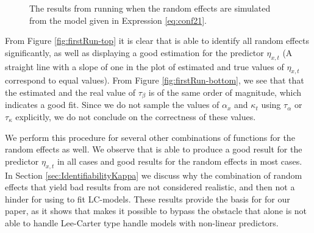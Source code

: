 \begin{figure}[h!]
    \caption{The results from running \inlabru when the random effects are simulated from the model given in Expression \ref{eq:conf21}. }
    \label{fig:firstRun}
\end{figure}
\newpar From Figure \ref{fig:firstRun-top} it is clear that \inlabru is able to identify all random effects significantly, as well as displaying a good estimation for the predictor $\eta_{x,t}$ (A straight line with a slope of one in the plot of estimated and true values of $\eta_{x,t}$ correspond to equal values). From Figure \ref{fig:firstRun-bottom}, we see that that the estimated and the real value of $\tau_\beta$ is of the same order of magnitude, which indicates a good fit. Since we do not sample the values of $\alpha_x$ and $\kappa_t$ using $\tau_\alpha$ or $\tau_\kappa$ explicitly, we do not conclude on the correctness of these values. 

\newpar We perform this procedure for several other combinations of functions for the random effects as well. We observe that \inlabru is able to produce a good result for the predictor $\eta_{x,t}$ in all cases and good results for the random effects in most cases. In Section \ref{sec:IdentifiabilityKappa} we discuss why the combination of random effects that yield bad results from \inlabru are not considered realistic, and then not a hinder for using \inlabru to fit LC-models. These results provide the basis for for our paper, as it shows that \inlabru makes it possible to bypass the obstacle that \inla alone is not able to handle Lee-Carter type handle models with non-linear predictors.


